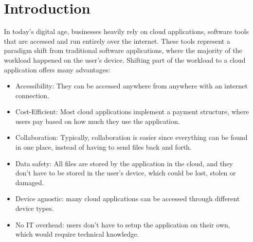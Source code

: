 \chapter{Introduction}
\label{cha:introduction}





In today's digital age, businesses heavily rely on cloud applications, 
software tools that are accessed and run entirely over the internet.
These tools represent a paradigm shift from traditional software applications,
where the majority of the workload happened on the user's device.
Shifting part of the workload to a cloud application offers many advantages:

\begin{itemize}
    \item Accessibility: They can be accessed anywhere from anywhere with an internet connection.
    \item Cost-Efficient: Most cloud applications implement a payment structure, where
      users pay based on how much they use the application.
    \item Collaboration: Typically, collaboration is easier since everything can be found
      in one place, instead of having to send files back and forth.
    \item Data safety: All files are stored by the application in the cloud, and they don't
      have to be stored in the user's device, which could be lost, stolen or damaged.
    \item Device agnostic: many cloud applications can be accessed through different device types.  
    \item No IT overhead: users don't have to setup the application on their own, which would require technical knowledge.
\end{itemize}

